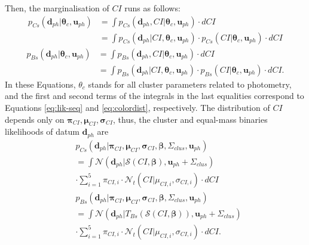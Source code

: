 Then, the marginalisation of $CI$ runs as follows:
\begin{align}
\label{eq:clmarginalps}
 p_{Cs}(\mathbf{d}_{ph}| \boldsymbol{\theta}_c,\mathbf{u}_{ph})&=\int p_{Cs}(\mathbf{d}_{ph},CI| \boldsymbol{\theta}_c,\mathbf{u}_{ph}) \cdot dCI \nonumber \\
 &=\int p_{Cs}(\mathbf{d}_{ph}|CI, \boldsymbol{\theta}_c,\mathbf{u}_{ph}) \cdot p_{Cs}(CI| \boldsymbol{\theta}_c,\mathbf{u}_{ph})\cdot dCI 
\end{align}
\begin{align}
\label{eq:clmarginalpb}
p_{Bs}(\mathbf{d}_{ph}| \boldsymbol{\theta}_c,\mathbf{u}_{ph})&=\int p_{Bs}(\mathbf{d}_{ph},CI| \boldsymbol{\theta}_c,\mathbf{u}_{ph})\cdot dCI \nonumber \\
 &=\int p_{Bs}(\mathbf{d}_{ph}|CI, \boldsymbol{\theta}_c,\mathbf{u}_{ph})\cdot p_{Bs}(CI| \boldsymbol{\theta}_c,\mathbf{u}_{ph})\cdot dCI.
\end{align}
In these Equations, $\theta_c$ stands for all cluster parameters related to photometry, and the first and second terms of the integrals in the last equalities correspond to Equations \ref{eq:lik-seq} and \ref{eq:colordist}, respectively. The distribution of $CI$ depends only on $\boldsymbol{\pi}_{CI},\boldsymbol{\mu}_{CI},\boldsymbol{\sigma}_{CI}$, thus, the cluster and equal-mass binaries likelihoods of datum $\mathbf{d}_{ph}$ are 
\begin{align}
\label{eq:lik-seq2}
 &p_{Cs}(\mathbf{d}_{ph}|\boldsymbol{\pi}_{CI},\boldsymbol{\mu}_{CI},\boldsymbol{\sigma}_{CI},\boldsymbol{\beta},\Sigma_{clus},\mathbf{u}_{ph}) \nonumber \\
 &=\int{\mathcal{N}}(\mathbf{d}_{ph}|\boldsymbol{\mathcal{S}}(CI, \boldsymbol{\beta}), \mathbf{u}_{ph}+\Sigma_{clus}) \nonumber \\
 &\cdot \sum_{i=1}^5 \pi_{CI,i}\cdot \mathcal{N}_t(CI| \mu_{CI,i},\sigma_{CI,i}) \cdot dCI\nonumber \\
&p_{Bs}(\mathbf{d}_{ph}|\boldsymbol{\pi}_{CI},\boldsymbol{\mu}_{CI},\boldsymbol{\sigma}_{CI}, \boldsymbol{\beta},\Sigma_{clus}, \mathbf{u}_{ph})\nonumber \\
&=\int{\mathcal{N}}(\mathbf{d}_{ph}|T_{Bs}( \boldsymbol{\mathcal{S}}(CI, \boldsymbol{\beta})), \mathbf{u}_{ph}+\Sigma_{clus}) \nonumber \\ &\cdot \sum_{i=1}^5 \pi_{CI,i}\cdot \mathcal{N}_t(CI| \mu_{CI,i},\sigma_{CI,i}) \cdot dCI.
\end{align}

